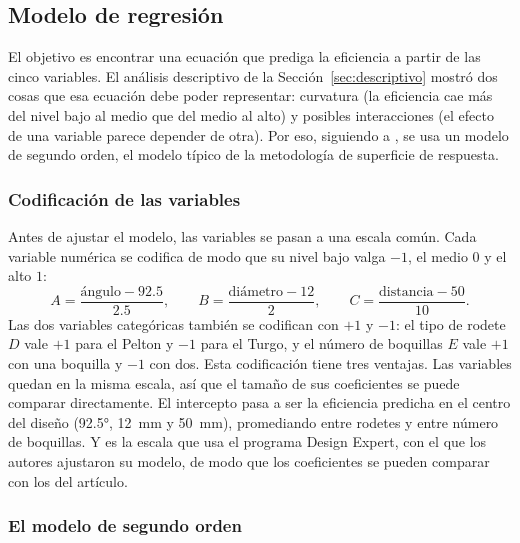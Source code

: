 \subsection{Modelo de regresión}
\label{sec:modelo}

El objetivo es encontrar una ecuación que prediga la eficiencia a partir de las cinco variables. El análisis descriptivo de la Sección~\ref{sec:descriptivo} mostró dos cosas que esa ecuación debe poder representar: curvatura (la eficiencia cae más del nivel bajo al medio que del medio al alto) y posibles interacciones (el efecto de una variable parece depender de otra). Por eso, siguiendo a \citet{Lakdawala2025}, se usa un modelo de segundo orden, el modelo típico de la metodología de superficie de respuesta.

\subsubsection{Codificación de las variables}

Antes de ajustar el modelo, las variables se pasan a una escala común. Cada variable numérica se codifica de modo que su nivel bajo valga $-1$, el medio $0$ y el alto $1$:
\[
A = \frac{\text{ángulo} - 92.5}{2.5}, \qquad
B = \frac{\text{diámetro} - 12}{2}, \qquad
C = \frac{\text{distancia} - 50}{10}.
\]
Las dos variables categóricas también se codifican con $+1$ y $-1$: el tipo de rodete $D$ vale $+1$ para el Pelton y $-1$ para el Turgo, y el número de boquillas $E$ vale $+1$ con una boquilla y $-1$ con dos. Esta codificación tiene tres ventajas. Las variables quedan en la misma escala, así que el tamaño de sus coeficientes se puede comparar directamente. El intercepto pasa a ser la eficiencia predicha en el centro del diseño (92.5°, 12~mm y 50~mm), promediando entre rodetes y entre número de boquillas. Y es la escala que usa el programa Design Expert, con el que los autores ajustaron su modelo, de modo que los coeficientes se pueden comparar con los del artículo.

\subsubsection{El modelo de segundo orden}


